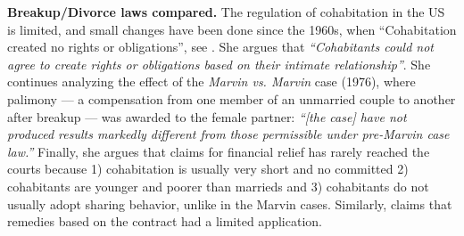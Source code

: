 \documentclass[12pt]{article}
\numberwithin{table}{section}
\begin{document}
%
\textbf{Breakup/Divorce laws compared.} The regulation of cohabitation in the US is limited, and small changes have been done since the 1960s, when “Cohabitation created no rights or obligations”, see \cite{garrison2008}. She argues that \textit{“Cohabitants could not agree to create rights or obligations based on their intimate relationship”}. She continues analyzing the effect of the \textit{Marvin vs. Marvin} case (1976), where palimony --- a compensation from one member of an unmarried couple to another after breakup --- was awarded to the female partner: \textit{“[the case] have not produced results markedly different from those permissible under pre-Marvin case law.”} Finally, she argues that claims for financial relief has rarely reached the courts because 1) cohabitation is usually very short and no committed 2) cohabitants are younger and poorer than marrieds and 3) cohabitants do not usually adopt sharing behavior, unlike in the Marvin cases. Similarly, \cite{bowman2004} claims that remedies based on the contract had a limited application.
\end{document}
